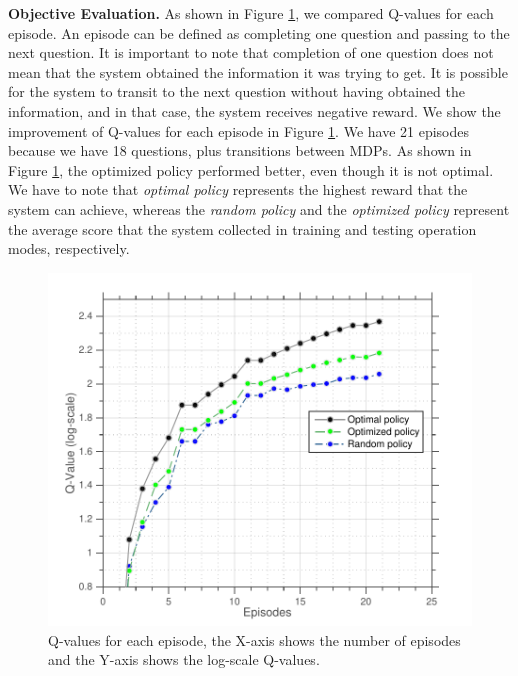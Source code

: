 \documentclass[letterpaper]{article}
\begin{document}
{\bf Objective Evaluation.}  
As shown in Figure \ref{q-values}, we compared Q-values for each episode. An episode can be defined as completing one question and passing to the next question. It is important to note that completion of one question does not mean that the system obtained the information it was trying to get. It is possible for the system to transit to the next question without having obtained the information, and in that case, the system receives negative reward. 
We show the improvement of Q-values for each episode in Figure \ref{q-values}. We have  21 episodes because we have 18 questions, plus transitions between MDPs. As shown in Figure \ref{q-values}, the optimized policy performed better, even though it is not optimal. We have to note that \textit{optimal policy} represents the highest reward that the system can achieve, whereas the \textit{random policy} and the \textit{optimized policy} represent the average score that the system collected in training and testing operation modes, respectively.\\

 \begin{figure}
 \centering
 \includegraphics[width=\columnwidth]{figures/q-values.pdf}
 \caption{Q-values for each episode, the X-axis shows the number of episodes and the Y-axis shows the log-scale Q-values.}
 \label{q-values}
 \end{figure}
\end{document}
